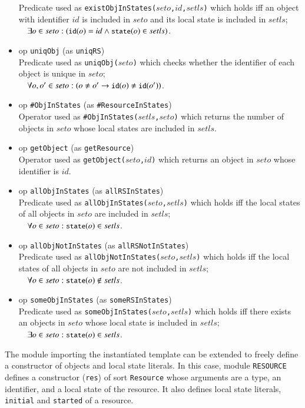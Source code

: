 \documentclass[12pt]{report}
\newcommand{\ra}{\rightarrow}
\newcommand{\mbstt}[1]{\mbox{\small{\tt {#1}}}}
\newcommand{\stt}[1]{{\small{\tt {#1}}}}
\begin{document}
\begin{itemize}
  Predicate used as \stt{existObjInStates($seto$,$id$,$setls$)} which
  holds iff an object with identifier $id$ is included in $seto$ and
  its local state is included in $setls$;\\$~~~~\exists o\in seto:
  (\mbstt{id}(o)=id \land \mbstt{state}(o)\in setls)$.
\item op \stt{uniqObj} (as \stt{uniqRS})\\
  Predicate used as \stt{uniqObj($seto$)} which checks whether the
  identifier of each object is unique in $seto$;\\$~~~~\forall o,o'\in
  seto:(o\ne o'\ra\mbstt{id}(o)\ne\mbstt{id}(o'))$.
\item op \stt{\#ObjInStates} (as \stt{\#ResourceInStates})\\ 
  Operator used as \stt{\#ObjInStates($setls$,$seto$)} which returns
  the number of objects in $seto$ whose local states are
  included in $setls$.
\item op \stt{getObject} (as \stt{getResource})\\ 
  Operator used as \stt{getObject($seto$,$id$)} which returns an
  object in $seto$ whose identifier is $id$.
\item op \stt{allObjInStates} (as \stt{allRSInStates})\\
  Predicate used as \stt{allObjInStates($seto$,$setls$)} which holds iff
  the local states of all objects in $seto$ are included
  in $setls$;\\$~~~~\forall o\in seto:\mbstt{state}(o)\in setls$.
\item op \stt{allObjNotInStates} (as \stt{allRSNotInStates})\\
  Predicate used as \stt{allObjNotInStates($seto$,$setls$)} which holds iff
  the local states of all objects in $seto$ are not included
  in $setls$;\\$~~~~\forall o\in seto:\mbstt{state}(o)\not\in setls$.
\item op \stt{someObjInStates} (as \stt{someRSInStates})\\ 
  Predicate used as \stt{someObjInStates($seto$,$setls$)} which holds
  iff there exists an objects in $seto$ whose local state is included
  in $setls$;\\$~~~~\exists o\in seto:\mbstt{state}(o)\in setls$.

\end{itemize}

The module importing the instantiated template can be extended to
freely define a constructor of objects and local state literals.  In
this case, module {\tt RESOURCE} defines a constructor ({\tt res}) of
sort {\tt Resource} whose arguments are a type, an identifier, and a
local state of the resource. It also defines local state literals,
{\tt initial} and {\tt started} of a resource.
\end{document}
